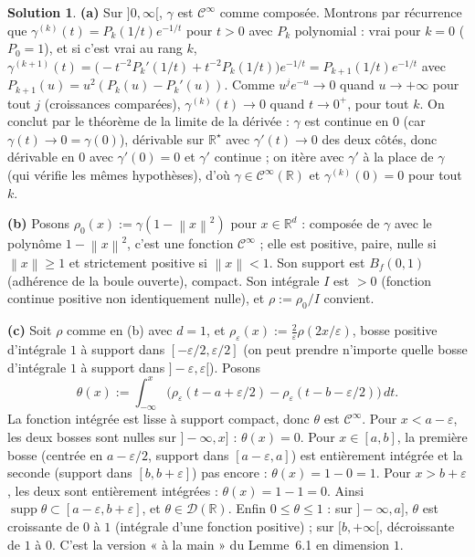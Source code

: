\documentclass[11pt,a4paper]{article}
\newcommand{\R}{\mathbb{R}}
\newcommand{\Bf}{B_f}
\newcommand{\norm}[1]{\left\|#1\right\|}
\newcommand{\Cinf}{\mathcal{C}^\infty}
\DeclareMathOperator{\supp}{supp}
\newcommand{\D}{\mathcal{D}}
\theoremstyle{definition}
\newtheorem*{solution}{Solution}
\begin{document}
\begin{solution}
\noindent\textbf{(a)} Sur $]0,\infty[$, $\gamma$ est $\Cinf$ comme composée. Montrons par récurrence que $\gamma^{(k)}(t)=P_k(1/t)e^{-1/t}$ pour $t>0$ avec $P_k$ polynomial : vrai pour $k=0$ ($P_0=1$), et si c'est vrai au rang $k$, $\gamma^{(k+1)}(t)=\big(-t^{-2}P_k'(1/t)+t^{-2}P_k(1/t)\big)e^{-1/t}=P_{k+1}(1/t)e^{-1/t}$ avec $P_{k+1}(u)=u^2(P_k(u)-P_k'(u))$. Comme $u^je^{-u}\to0$ quand $u\to+\infty$ pour tout $j$ (croissances comparées), $\gamma^{(k)}(t)\to0$ quand $t\to0^+$, pour tout $k$. On conclut par le théorème de la limite de la dérivée : $\gamma$ est continue en $0$ (car $\gamma(t)\to0=\gamma(0)$), dérivable sur $\R^\star$ avec $\gamma'(t)\to0$ des deux côtés, donc dérivable en $0$ avec $\gamma'(0)=0$ et $\gamma'$ continue ; on itère avec $\gamma'$ à la place de $\gamma$ (qui vérifie les mêmes hypothèses), d'où $\gamma\in\Cinf(\R)$ et $\gamma^{(k)}(0)=0$ pour tout $k$.

\medskip
\noindent\textbf{(b)} Posons $\rho_0(x):=\gamma(1-\norm x^2)$ pour $x\in\R^d$ : composée de $\gamma$ avec le polynôme $1-\norm x^2$, c'est une fonction $\Cinf$ ; elle est positive, paire, nulle si $\norm x\ge1$ et strictement positive si $\norm x<1$. Son support est $\Bf(0,1)$ (adhérence de la boule ouverte), compact. Son intégrale $I$ est $>0$ (fonction continue positive non identiquement nulle), et $\rho:=\rho_0/I$ convient.

\medskip
\noindent\textbf{(c)} Soit $\rho$ comme en (b) avec $d=1$, et $\rho_\varepsilon(x):=\frac2\varepsilon\rho(2x/\varepsilon)$, bosse positive d'intégrale $1$ à support dans $[-\varepsilon/2,\varepsilon/2]$ (on peut prendre n'importe quelle bosse d'intégrale $1$ à support dans $]-\varepsilon,\varepsilon[$). Posons
\[
\theta(x):=\int_{-\infty}^x\big(\rho_\varepsilon(t-a+\varepsilon/2)-\rho_\varepsilon(t-b-\varepsilon/2)\big)\,dt .
\]
La fonction intégrée est lisse à support compact, donc $\theta$ est $\Cinf$. Pour $x<a-\varepsilon$, les deux bosses sont nulles sur $]-\infty,x]$ : $\theta(x)=0$. Pour $x\in[a,b]$, la première bosse (centrée en $a-\varepsilon/2$, support dans $[a-\varepsilon,a]$) est entièrement intégrée et la seconde (support dans $[b,b+\varepsilon]$) pas encore : $\theta(x)=1-0=1$. Pour $x>b+\varepsilon$, les deux sont entièrement intégrées : $\theta(x)=1-1=0$. Ainsi $\supp\theta\subset[a-\varepsilon,b+\varepsilon]$, et $\theta\in\D(\R)$. Enfin $0\le\theta\le1$ : sur $]-\infty,a]$, $\theta$ est croissante de $0$ à $1$ (intégrale d'une fonction positive) ; sur $[b,+\infty[$, décroissante de $1$ à $0$. C'est la version « à la main » du Lemme~6.1 en dimension $1$.


\end{solution}
\end{document}
